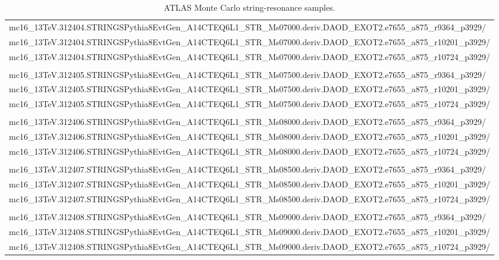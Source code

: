 \begin{sidewaystable}[p]
\begin{small}
\begin{tabular}{l}
mc16\_13TeV.312404.STRINGSPythia8EvtGen\_A14CTEQ6L1\_STR\_Ms07000.deriv.DAOD\_EXOT2.e7655\_a875\_r9364\_p3929/\\
mc16\_13TeV.312404.STRINGSPythia8EvtGen\_A14CTEQ6L1\_STR\_Ms07000.deriv.DAOD\_EXOT2.e7655\_a875\_r10201\_p3929/\\
mc16\_13TeV.312404.STRINGSPythia8EvtGen\_A14CTEQ6L1\_STR\_Ms07000.deriv.DAOD\_EXOT2.e7655\_a875\_r10724\_p3929/\\
\\
mc16\_13TeV.312405.STRINGSPythia8EvtGen\_A14CTEQ6L1\_STR\_Ms07500.deriv.DAOD\_EXOT2.e7655\_a875\_r9364\_p3929/\\
mc16\_13TeV.312405.STRINGSPythia8EvtGen\_A14CTEQ6L1\_STR\_Ms07500.deriv.DAOD\_EXOT2.e7655\_a875\_r10201\_p3929/\\
mc16\_13TeV.312405.STRINGSPythia8EvtGen\_A14CTEQ6L1\_STR\_Ms07500.deriv.DAOD\_EXOT2.e7655\_a875\_r10724\_p3929/\\
\\
mc16\_13TeV.312406.STRINGSPythia8EvtGen\_A14CTEQ6L1\_STR\_Ms08000.deriv.DAOD\_EXOT2.e7655\_a875\_r9364\_p3929/\\
mc16\_13TeV.312406.STRINGSPythia8EvtGen\_A14CTEQ6L1\_STR\_Ms08000.deriv.DAOD\_EXOT2.e7655\_a875\_r10201\_p3929/\\
mc16\_13TeV.312406.STRINGSPythia8EvtGen\_A14CTEQ6L1\_STR\_Ms08000.deriv.DAOD\_EXOT2.e7655\_a875\_r10724\_p3929/\\
\\
mc16\_13TeV.312407.STRINGSPythia8EvtGen\_A14CTEQ6L1\_STR\_Ms08500.deriv.DAOD\_EXOT2.e7655\_a875\_r9364\_p3929/\\
mc16\_13TeV.312407.STRINGSPythia8EvtGen\_A14CTEQ6L1\_STR\_Ms08500.deriv.DAOD\_EXOT2.e7655\_a875\_r10201\_p3929/\\
mc16\_13TeV.312407.STRINGSPythia8EvtGen\_A14CTEQ6L1\_STR\_Ms08500.deriv.DAOD\_EXOT2.e7655\_a875\_r10724\_p3929/\\
\\
mc16\_13TeV.312408.STRINGSPythia8EvtGen\_A14CTEQ6L1\_STR\_Ms09000.deriv.DAOD\_EXOT2.e7655\_a875\_r9364\_p3929/\\
mc16\_13TeV.312408.STRINGSPythia8EvtGen\_A14CTEQ6L1\_STR\_Ms09000.deriv.DAOD\_EXOT2.e7655\_a875\_r10201\_p3929/\\
mc16\_13TeV.312408.STRINGSPythia8EvtGen\_A14CTEQ6L1\_STR\_Ms09000.deriv.DAOD\_EXOT2.e7655\_a875\_r10724\_p3929/\\
\end{tabular}
\end{small}
\caption{ATLAS Monte Carlo string-resonance samples.}
\label{tab4}
\end{sidewaystable}

